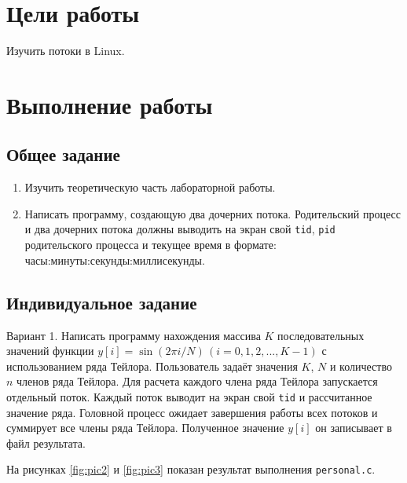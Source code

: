 \section{Цели работы}
\label{sec:target}

Изучить потоки в Linux.

\section{Выполнение работы}
\label{sec:job} 
\subsection{Общее задание}
\label{sec:job:general_task}

\begin{enumerate}[listparindent=\fivecharsapprox]
	\item Изучить теоретическую часть лабораторной работы.
	\item Написать программу, создающую два дочерних потока. Родительский процесс и два дочерних потока должны выводить на экран свой \lstinline{tid}, \lstinline{pid} родительского процесса и текущее время в формате: часы:минуты:секунды:миллисекунды.



\end{enumerate}

\subsection{Индивидуальное задание}
\label{sec:job:personal_task}

Вариант 1. Написать программу нахождения массива \(K\) последовательных значений функции \(y[i] = \sin{(2 \pi i / N)}\, (i = 0, 1, 2, ..., K - 1)\) с использованием ряда Тейлора.
Пользователь задаёт значения \(K\), \(N\) и количество \(n\) членов ряда Тейлора. Для расчета каждого члена ряда Тейлора запускается отдельный поток. Каждый поток выводит на экран свой \lstinline{tid} и рассчитанное значение ряда.
Головной процесс ожидает завершения работы всех потоков и суммирует все члены ряда Тейлора. Полученное значение \(y[i]\) он записывает в файл результата. 


На рисунках \ref{fig:pic2} и \ref{fig:pic3} показан результат выполнения \lstinline{personal.c}.


